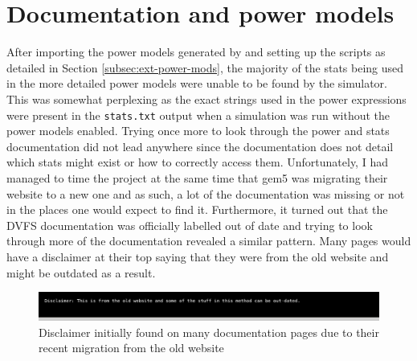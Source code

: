 \section{Documentation and power models}
After importing the power models generated by 
\cite{walker_mattw200gemstone-applypower_2018} and setting up the scripts as
detailed in Section \ref{subsec:ext-power-mods}, the majority of the stats 
being used in the more detailed power models were unable to be found by the 
simulator. This was somewhat perplexing as the exact strings used in the 
power expressions were present in the \texttt{stats.txt} output when a 
simulation was run without the power models enabled. Trying once more to 
look through the power \cite{noauthor_gem5_nodate-1} and stats 
\cite{noauthor_gem5_nodate-3} documentation did not lead anywhere since the 
documentation does not detail which stats might exist or how to correctly 
access them. Unfortunately, I had managed to time the project at the same 
time that gem5 was migrating their website to a new one and as such, a lot 
of the documentation was missing or not in the places one would expect to 
find it. Furthermore, it turned out that the DVFS documentation was 
officially labelled out of date \cite{noauthor_gem5_nodate} and trying to 
look through more of the documentation revealed a similar pattern. Many 
pages would have a disclaimer at their top saying that they were from the 
old website and might be outdated as a result.
\begin{figure}[H]
    \centering
    \includegraphics[width=0.9\linewidth]{screenshots/gem5-docs-disclaimer.png}
    \caption{Disclaimer initially found on many documentation pages due to 
             their recent migration from the old website}
\end{figure}


